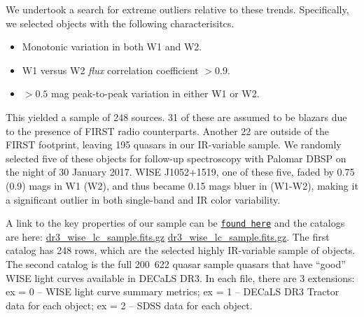 \documentclass{emulateapj}
\begin{document}
We undertook a search for extreme outliers relative to these trends.
Specifically, we selected objects with the following characterisitcs.

\begin{itemize}
\item Monotonic variation in both W1 and W2.
\item W1 versus W2 \textit{flux} correlation coefficient $>$0.9.
\item $>0.5$ mag peak-to-peak variation in either W1 or W2.
\end{itemize}

This yielded a sample of 248 sources. 31 of these are assumed to be blazars 
due to the presence of FIRST radio counterparts. Another 22 are outside of the 
FIRST  footprint, leaving 195 quasars in our IR-variable sample. We randomly 
selected five of these objects for follow-up spectroscopy with Palomar DBSP on
the night of 30 January 2017. WISE J1052+1519, one of these five, 
faded by 0.75 (0.9) mags in W1 (W2), and thus became 0.15 mags bluer in 
(W1-W2), making it a significant outlier in both single-band and IR color 
variability.

A link to the key properties of our sample can be
\href{http://portal.nersc.gov/project/cosmo/temp/ameisner/qso\_pages\_v01/}
{\tt found here} and the catalogs are here:
\href{http://portal.nersc.gov/project/cosmo/temp/ameisner/dr3_wise_lc_sample.fits.gz}{dr3\_wise\_lc\_sample.fits.gz}
\href{http://portal.nersc.gov/project/cosmo/temp/ameisner/dr3_wise_lc_metrics_all_qso.fits.gz}{dr3\_wise\_lc\_sample.fits.gz}.
The first catalog has 248 rows, which are the selected highly
IR-variable sample of objects.  The second catalog is the full
\hbox{200 622} quasar sample quasars that have ``good'' WISE light
curves available in DECaLS DR3. In each file, there are 3 extensions:
ex = 0 -- WISE light curve summary metrics; ex = 1 -- DECaLS DR3
Tractor data for each object; ex = 2 -- SDSS data for each object.



\end{document}
